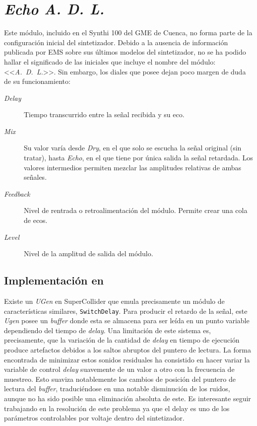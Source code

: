 \section{\textit{Echo A. D. L.}}


Este módulo, incluido en el Synthi 100 del GME de Cuenca, no forma parte de la configuración inicial del sintetizador. Debido a la ausencia de información publicada por EMS sobre sus últimos modelos del sintetizador, no se ha podido hallar el significado de las iniciales que incluye el nombre del módulo: <<\textit{A.~D.~L.}>>. Sin embargo, los diales que posee dejan poco margen de duda de su funcionamiento:

\begin{description}
	\item[\textit{Delay}] Tiempo transcurrido entre la señal recibida y su eco.
	\item[\textit{Mix}] Su valor varía desde \textit{Dry}, en el que solo se escucha la señal original (sin tratar), hasta \textit{Echo}, en el que tiene por única salida la señal retardada. Los valores intermedios permiten mezclar las amplitudes relativas de ambas señales.
	\item[\textit{Feedback}] Nivel de rentrada o retroalimentación del módulo. Permite crear una cola de ecos. 
	\item[\textit{Level}] Nivel de la amplitud de salida del módulo.
\end{description}

\subsection{Implementación en \appName}

Existe un \textit{UGen} en SuperCollider que emula precisamente un módulo de características similares, \texttt{SwitchDelay}. Para producir el retardo de la señal, este \textit{Ugen} posee un \textit{buffer} donde esta se almacena para ser leída en un punto variable dependiendo del tiempo de \textit{delay}. Una limitación de este sistema es, precisamente, que la variación de la cantidad de \textit{delay} en tiempo de ejecución produce artefactos debidos a los saltos abruptos del puntero de lectura. La forma encontrada de minimizar estos sonidos residuales ha consistido en hacer variar la variable de control \textit{delay} suavemente de un valor a otro con la frecuencia de muestreo. Esto suaviza notablemente los cambios de posición del puntero de lectura del \textit{buffer}, traduciéndose en una notable disminución de los ruidos, aunque no ha sido posible una eliminación absoluta de este. Es interesante seguir trabajando en la resolución de este problema ya que el delay es uno de los parámetros controlables por voltaje dentro del sintetizador.

